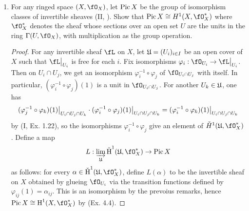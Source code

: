 \documentclass[a4paper]{article}
\begin{document}
\begin{enumerate} [label=\textbf{\arabic*.}, leftmargin=0em]
\begin{proof}
\begin{itemize} [leftmargin=0cm]
\[\begin{tikzcd}
                    \end{tikzcd} \]
                  By the Snake lemma, it suffices to show
                  \begin{equation*}
                    \varinjlim_\goth{U} \cH_D^0(\goth{U}) \cong \cH^0(X, \fR).
                  \end{equation*}
                  \textit{Not finished.}
          \end{itemize}
        \end{proof}

  \item For any ringed space $(X, \fO_X)$, let $\operatorname{Pic}{X}$ be the group of isomorphism classes of invertible sheaves (II, ).
        Show that $\pic{X} \cong H^1(X, \fO_X^*)$ where $\fO_X^*$ denotes the sheaf whose sections over an open set $U$ are the units in the ring $\Gamma(U, \fO_X)$, with multiplication as the group operation.

        \begin{proof}
          For any invertible sheaf $\fL$ on $X$, let $\mathfrak{U} = (U_i)_{i \in I}$ be an open cover of $X$ such that $\restr{\fL}{U_i}$ is free for each $i$.
          Fix isomorphisms $\varphi_i : \fO_{U_i} \to \restr{\fL}{U_i}$.
          Then on $U_i \cap U_j$, we get an isomorphism $\varphi_i^{-1} \circ \varphi_j$ of $\fO_{U_i \cap U_j}$ with itself.
          In particular, $(\varphi_i^{-1} \circ \varphi_j)(1)$ is a unit in $\fO_{U_i \cap U_j}$.
          For another $U_k \in \mathfrak{U}$, one has
          \begin{equation*}
            \restr{(\varphi_j^{-1} \circ \varphi_k)(1)}{U_i \cap U_j \cap U_k} \cdot \restr{(\varphi_i^{-1} \circ \varphi_j)(1)}{U_i \cap U_j \cap U_k} = \restr{(\varphi_i^{-1} \circ \varphi_k)(1)}{U_i \cap U_j \cap U_k}
          \end{equation*}
          by (I, Ex. 1.22), so the isomorphisms $\varphi^{-1}_i \circ \varphi_j$ give an element of $\check{H}^1(\goth{U}, \fO_X^*)$.
          Define a map
          \begin{equation*}
            L : \varinjlim_\goth{U} \check{\cH}^1(\goth{U}, \fO_X^*) \to \pic{X}
          \end{equation*}
          as follows: for every $\alpha \in \check{\cH}^1(\goth{U}, \fO_X^*)$, define $L(\alpha)$ to be the invertible sheaf on $X$ obtained by glueing $\fO_{U_i}$ via the transition functions defined by $\varphi_{ij}(1) = \alpha_{ij}$.
          This is an isomorphism by the prevoius remarks, hence $\pic{X} \cong \cH^1(X, \fO_X^*)$ by (Ex. 4.4).
        \end{proof}

\end{enumerate}
\end{document}
